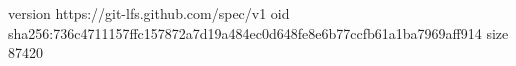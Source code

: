 version https://git-lfs.github.com/spec/v1
oid sha256:736c4711157ffc157872a7d19a484ec0d648fe8e6b77ccfb61a1ba7969aff914
size 87420

